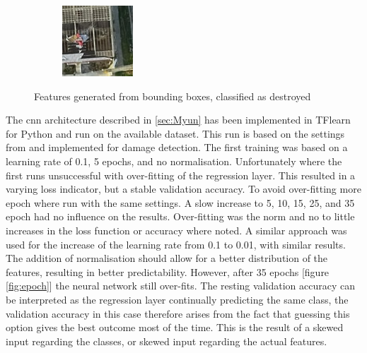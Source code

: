 \begin{figure} [H]
\begin{subfigure}{.275\textwidth}
	\end{subfigure}
	\begin{subfigure}{.275\textwidth}
		\centering
		\includegraphics[width=.95\linewidth]{figs/9.jpg}
	\end{subfigure}

	\caption{\footnotesize{Features generated from bounding boxes, classified as destroyed}}
	\label{fig:features}
\end{figure}

\noindent The \ac{cnn} architecture described in \ref{sec:Myun} has been implemented in TFlearn for Python and run on the available dataset. This run is based on the settings from \citet{Vetrivel2016b} and implemented for damage detection. The first training was based on a learning rate of 0.1, 5 epochs, and no normalisation. Unfortunately where the first runs unsuccessful with over-fitting of the regression layer. This resulted in a varying loss indicator, but a stable validation accuracy. To avoid over-fitting more epoch where run with the same settings. A slow increase to 5, 10, 15, 25, and 35 epoch had no influence on the results. Over-fitting was the norm and no to little increases in the loss function or accuracy where noted. A similar approach was used for the increase of the learning rate from 0.1 to 0.01, with similar results. The addition of normalisation should allow for a better distribution of the features, resulting in better predictability. However, after 35 epochs [figure \ref{fig:epoch}] the neural network still over-fits. The resting validation accuracy can be interpreted as the regression layer continually predicting the same class, the validation accuracy in this case therefore arises from the fact that guessing this option gives the best outcome most of the time. This is the result of a skewed input regarding the classes, or skewed input regarding the actual features. 

